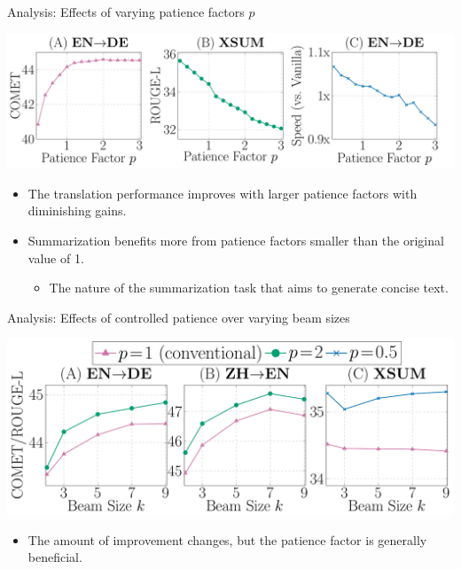 \documentclass[t, unicode, 12pt, xdvipdfmx, aspectratio=169, bxjsarticle]{beamer}
\begin{document}
\begin{frame}[label={sec:org35498ef}]{Analysis: Effects of varying patience factors \(p\)}
\begin{center}
\includegraphics[width=0.8\linewidth]{./figure/varying_p.pdf}
\end{center}

\begin{itemize}
\item The translation performance improves with larger patience factors with diminishing gains.
\item Summarization benefits more from patience factors smaller than the original value of 1.
\begin{itemize}
\item The nature of the summarization task that aims to generate concise text.
\end{itemize}
\end{itemize}
\end{frame}

\begin{frame}[label={sec:org6c8ca4c}]{Analysis: Effects of controlled patience over varying beam sizes}
\begin{center}
\includegraphics[width=0.65\linewidth]{./figure/varying_beam.pdf}
\end{center}

\vspace{-0.3cm}
\begin{itemize}
\item The amount of improvement changes, but the patience factor is generally beneficial.
\end{itemize}
\end{frame}
\end{document}
